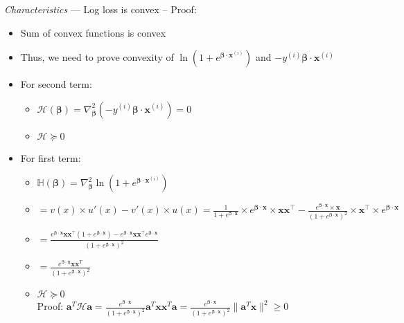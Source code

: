 \emph{Characteristics} --- 
Log loss is convex – Proof:
\begin{itemize}
    \item Sum of convex functions is convex
    \item Thus, we need to prove convexity of $ \ln(1 + e^{\boldsymbol{\beta} \cdot \boldsymbol{x}^{(i)}}) $ and $ -y^{(i)} \boldsymbol{\beta} \cdot \boldsymbol{x}^{(i)} $
    \item For second term:
    \begin{itemize}
        \item $\mathcal{H}(\boldsymbol{\beta}) = \nabla^2_{\boldsymbol{\beta}} \left(-y^{(i)} \boldsymbol{\beta} \cdot \boldsymbol{x}^{(i)}\right) = 0$
        \item $ \mathcal{H} \succcurlyeq 0 $
    \end{itemize}
    \item For first term:
    \begin{itemize}
        \item $ \mathbb{H}(\boldsymbol{\beta}) = \nabla^2_{\boldsymbol{\beta}} \ln(1 + e^{\boldsymbol{\beta} \cdot \boldsymbol{x}^{(i)}}) $
        \item $ = v(x) \times u'(x) - v'(x) \times u(x) = \frac{1}{1 + e^{\boldsymbol{\beta} \cdot \boldsymbol{x}}} \times e^{\boldsymbol{\beta} \cdot \boldsymbol{x}} \times \boldsymbol{x} \boldsymbol{x}^\intercal - \frac{e^{\boldsymbol{\beta} \cdot \boldsymbol{x}} \times \boldsymbol{x}}{(1 + e^{\boldsymbol{\beta} \cdot \boldsymbol{x}})^2} \times \boldsymbol{x}^\intercal \times e^{\boldsymbol{\beta} \cdot \boldsymbol{x}}$
        \item $= \frac{e^{\boldsymbol{\beta} \cdot \boldsymbol{x}} \boldsymbol{x} \boldsymbol{x}^\intercal (1 + e^{\boldsymbol{\beta} \cdot \boldsymbol{x}}) - e^{\boldsymbol{\beta} \cdot \boldsymbol{x}} \boldsymbol{x} \boldsymbol{x}^\intercal e^{\boldsymbol{\beta} \cdot \boldsymbol{x}}}{(1 + e^{\boldsymbol{\beta} \cdot \boldsymbol{x}})^2}$
        \item $ = \frac{e^{\boldsymbol{\beta} \cdot \boldsymbol{x}} \boldsymbol{x} \boldsymbol{x}^T}{(1 + e^{\boldsymbol{\beta} \cdot \boldsymbol{x}})^2} $
        \item $ \mathcal{H} \succcurlyeq 0 $\\
        Proof:
        $ \boldsymbol{a}^T \mathcal{H} \boldsymbol{a} = \frac{e^{\boldsymbol{\beta} \cdot \boldsymbol{x}}}{(1 + e^{\boldsymbol{\beta} \cdot \boldsymbol{x}})^2} \boldsymbol{a}^T \boldsymbol{x} \boldsymbol{x}^T \boldsymbol{a} = \frac{e^{\boldsymbol{\beta} \cdot \boldsymbol{x}}}{(1 + e^{\boldsymbol{\beta} \cdot \boldsymbol{x}})^2} \lVert \boldsymbol{a}^T \boldsymbol{x} \rVert^2 \geq 0$
    \end{itemize}
\end{itemize}
